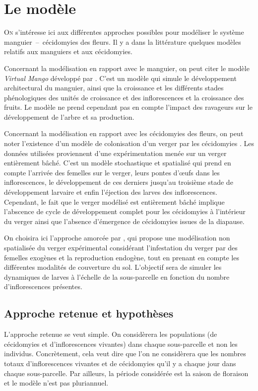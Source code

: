 \chapter{Le modèle}

\lettrine{O}{n} s'intéresse ici aux différentes approches possibles pour modéliser le système manguier~--~cécidomyies des fleurs. 
Il y a dans la littérature quelques modèles relatifs aux manguiers et aux cécidomyies.

Concernant la modélisation en rapport avec le manguier, on peut citer le modèle \emph{Virtual Mango} développé par \citet{fred}.
C'est un modèle qui simule le développement architectural du manguier, ainsi que la croissance et les différents stades phénologiques des unités de croissance et des inflorescences et la croissance des fruits.
Le modèle ne prend cependant pas en compte l'impact des ravageurs sur le développement de l'arbre et sa production.

Concernant la modélisation en rapport avec les cécidomyies des fleurs, on peut noter l'existence d'un modèle de colonisation d'un verger par les cécidomyies \citep{paul}. 
Les données utilisées proviennent d'une expérimentation menée sur un verger entièrement bâché. 
C'est un modèle stochastique et spatialisé qui prend en compte l'arrivée des femelles sur le verger, leurs pontes d'œufs dans les inflorescences, le développement de ces derniers jusqu'au troisième stade de développement larvaire et enfin l'éjection des larves des inflorescences.
Cependant, le fait que le verger modélisé est entièrement bâché implique l'abscence de cycle de développement complet pour les cécidomyies à l'intérieur du verger ainsi que l'absence d'émergence de cécidomyies issues de la diapause.

On choisira ici l'approche amorcée par \citet{laurie}, qui propose une modélisation non spatialisée du verger expérimental considérant l'infestation du verger par des femelles exogènes et la reproduction endogène, tout en prenant en compte les différentes modalités de couverture du sol.
L'objectif sera de simuler les dynamiques de larves à l'échelle de la sous-parcelle en fonction du nombre d'inflorescences présentes.

\section{Approche retenue et hypothèses}

L'approche retenue se veut simple.
On considèrera les populations (de cécidomyies et d'inflorescences vivantes) dans chaque sous-parcelle et non les individus.
Concrètement, cela veut dire que l'on ne considèrera que les nombres totaux d'inflorescences vivantes et de cécidomyies qu'il y a chaque jour dans chaque sous-parcelle.
Par ailleurs, la période considérée est la saison de floraison et le modèle n'est pas pluriannuel.

